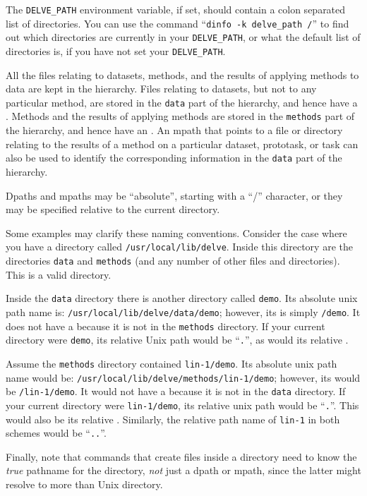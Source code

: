 The \texttt{DELVE\_PATH} environment variable, if set, should
contain a colon separated list of \delve{} directories. You can use the
command ``\texttt{dinfo -k delve\_path /}'' to find out which directories
are currently in your \texttt{DELVE\_PATH}, or what the default list
of directories is, if you have not set your \texttt{DELVE\_PATH}.

All the files relating to \delve{} datasets, methods, and the results
of applying methods to data are kept in the \delve{} hierarchy. Files
relating to datasets, but not to any particular method, are stored in
the \texttt{data} part of the hierarchy, and hence have a \dpath.
Methods and the results of applying methods are stored in the
\texttt{methods} part of the hierarchy, and hence have an \mpath.  An
mpath that points to a file or directory relating to the results of a
method on a particular dataset, prototask, or task can also be used to
identify the corresponding information in the \texttt{data} part
of the hierarchy.

Dpaths and mpaths may be ``absolute'', starting with a ``/'' character,
or they may be specified relative to the current directory.

Some examples may clarify these naming conventions. Consider the case
where you have a directory called \texttt{/usr/local/lib/delve}.
Inside this directory are the directories \texttt{data} and
\texttt{methods} (and any number of other files and directories).
This is a valid \delve{} directory.

Inside the \texttt{data} directory there is another directory called
\texttt{demo}.  Its absolute unix path name is:
\texttt{/usr/local/lib/delve/data/demo}; however, its \dpath{} is
simply \texttt{/demo}.  It does not have a \mpath{} because it is not
in the \texttt{methods} directory.  If your current directory were
\texttt{demo}, its relative Unix path would be ``\texttt{.}'', as would
its relative \dpath.

Assume the \texttt{methods} directory contained
\texttt{lin-1/demo}. Its absolute unix path name would be:
\texttt{/usr/local/lib/delve/methods/lin-1/demo}; however, its
\mpath{} would be \texttt{/lin-1/demo}.  It would not have a \dpath{}
because it is not in the \texttt{data} directory.  If your current
directory were \texttt{lin-1/demo}, its relative unix path would be
``\texttt{.}''. This would also be its relative \mpath. Similarly, the
relative path name of \texttt{lin-1} in both schemes would be
``\texttt{..}''.

Finally, note that commands that create files inside a directory need
to know the \emph{true} pathname for the directory, \emph{not} just a
dpath or mpath, since the latter might resolve to more than Unix
directory.

